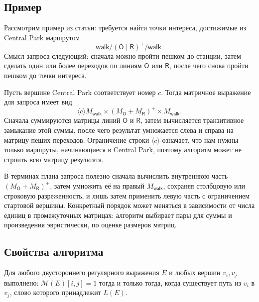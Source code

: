 \subsection{Пример}
\label{subsec:RPQ_Arroyuelo_example}

Рассмотрим пример из статьи: требуется найти точки интереса, достижимые из Central Park маршрутом
\[
    \mathsf{walk}/(\mathsf{O} \mid \mathsf{R})^+/\mathsf{walk}.
\]
Смысл запроса следующий: сначала можно пройти пешком до станции, затем сделать один или более переходов по линиям $\mathsf{O}$ или $\mathsf{R}$, после чего снова пройти пешком до точки интереса.

Пусть вершине Central Park соответствует номер $c$. Тогда матричное выражение для запроса имеет вид
\[
    \langle c\rangle M_{\mathsf{walk}}
    \times (M_{\mathsf{O}} + M_{\mathsf{R}})^+
    \times M_{\mathsf{walk}}.
\]
Сначала суммируются матрицы линий $\mathsf{O}$ и $\mathsf{R}$, затем вычисляется транзитивное замыкание этой суммы, после чего результат умножается слева и справа на матрицу пеших переходов. Ограничение строки $\langle c\rangle$ означает, что нам нужны только маршруты, начинающиеся в Central Park, поэтому алгоритм может не строить всю матрицу результата.

В терминах плана запроса полезно сначала вычислить внутреннюю часть $(M_{\mathsf{O}} + M_{\mathsf{R}})^+$, затем умножить её на правый $M_{\mathsf{walk}}$, сохраняя столбцовую или строковую разреженность, и лишь затем применить левую часть с ограничением стартовой вершины. Конкретный порядок может меняться в зависимости от числа единиц в промежуточных матрицах: алгоритм выбирает пары для суммы и произведения эвристически, по оценке размеров матриц.

\subsection{Свойства алгоритма}
\label{subsec:RPQ_Arroyuelo_properties}

\begin{theorem}
    Для любого двустороннего регулярного выражения $E$ и любых вершин $v_i,v_j$ выполнено: $\mathcal{M}(E)[i,j]=1$ тогда и только тогда, когда существует путь из $v_i$ в $v_j$, слово которого принадлежит $L(E)$.
\end{theorem}

